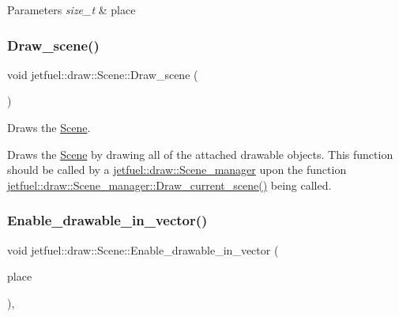 \begin{DoxyParams}{Parameters}
{\em size\+\_\+t} & place \\
\hline
\end{DoxyParams}
\mbox{\label{classjetfuel_1_1draw_1_1Scene_a80b9b5f38022b6c2af9921656f93056b}} 
\subsubsection{\texorpdfstring{Draw\+\_\+scene()}{Draw\_scene()}}
{\footnotesize\ttfamily void jetfuel\+::draw\+::\+Scene\+::\+Draw\+\_\+scene (\begin{DoxyParamCaption}{ }\end{DoxyParamCaption})}



Draws the \hyperlink{classjetfuel_1_1draw_1_1Scene}{Scene}. 

Draws the \hyperlink{classjetfuel_1_1draw_1_1Scene}{Scene} by drawing all of the attached drawable objects. This function should be called by a \hyperlink{classjetfuel_1_1draw_1_1Scene__manager}{jetfuel\+::draw\+::\+Scene\+\_\+manager} upon the function \hyperlink{classjetfuel_1_1draw_1_1Scene__manager_a8af9a3abfd5121b1b8556342de435773}{jetfuel\+::draw\+::\+Scene\+\_\+manager\+::\+Draw\+\_\+current\+\_\+scene()} being called. \mbox{\label{classjetfuel_1_1draw_1_1Scene_a517687bb7b400a9e0b82c4c53e1939cc}} 
\subsubsection{\texorpdfstring{Enable\+\_\+drawable\+\_\+in\+\_\+vector()}{Enable\_drawable\_in\_vector()}}
{\footnotesize\ttfamily void jetfuel\+::draw\+::\+Scene\+::\+Enable\+\_\+drawable\+\_\+in\+\_\+vector (\begin{DoxyParamCaption}\item[{size\+\_\+t}]{place }\end{DoxyParamCaption})\hspace{0.3cm}{\ttfamily [inline]}, {\ttfamily [protected]}}



